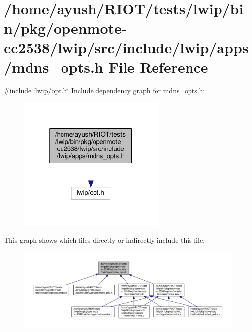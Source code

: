 \hypertarget{openmote-cc2538_2lwip_2src_2include_2lwip_2apps_2mdns__opts_8h}{}\section{/home/ayush/\+R\+I\+O\+T/tests/lwip/bin/pkg/openmote-\/cc2538/lwip/src/include/lwip/apps/mdns\+\_\+opts.h File Reference}
\label{openmote-cc2538_2lwip_2src_2include_2lwip_2apps_2mdns__opts_8h}
{\ttfamily \#include \char`\"{}lwip/opt.\+h\char`\"{}}\newline
Include dependency graph for mdns\+\_\+opts.\+h\+:
\nopagebreak
\begin{figure}[H]
\begin{center}
\leavevmode
\includegraphics[width=205pt]{openmote-cc2538_2lwip_2src_2include_2lwip_2apps_2mdns__opts_8h__incl}
\end{center}
\end{figure}
This graph shows which files directly or indirectly include this file\+:
\nopagebreak
\begin{figure}[H]
\begin{center}
\leavevmode
\includegraphics[width=350pt]{openmote-cc2538_2lwip_2src_2include_2lwip_2apps_2mdns__opts_8h__dep__incl}
\end{center}
\end{figure}
